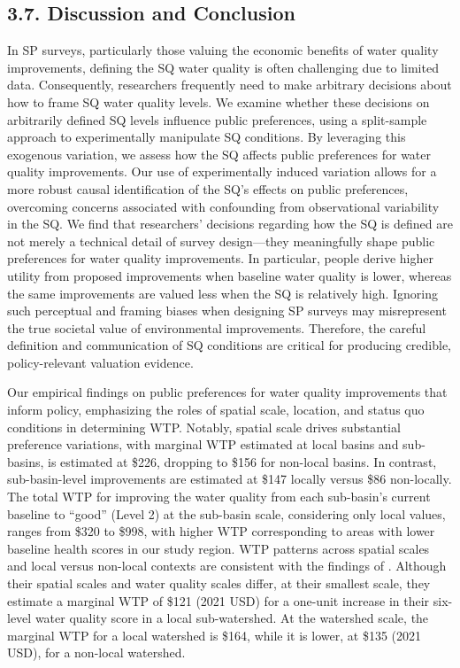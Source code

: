 \documentclass[12pt]{article}
\begin{document}
\restoregeometry %

\subsection*{3.7. Discussion and Conclusion}





In SP surveys, particularly those valuing the economic benefits of water quality improvements, defining the SQ water quality is often 
challenging due to limited data. Consequently, researchers frequently need to make arbitrary decisions about how to frame SQ water 
quality levels. We examine whether these decisions on arbitrarily defined SQ levels influence public preferences, using a split-sample 
approach to experimentally manipulate SQ conditions. By leveraging this exogenous variation, we assess how the SQ affects public 
preferences for water quality improvements. Our use of experimentally induced variation allows for a more robust causal identification 
of the SQ's effects on public preferences, overcoming concerns associated with confounding from observational variability in the SQ. We 
find that researchers’ decisions regarding how the SQ is defined are not merely a technical detail of survey design—they meaningfully 
shape public preferences for water quality improvements. In particular, people derive higher utility from proposed improvements 
when baseline water quality is lower, whereas the same improvements are valued less when the SQ is relatively high. Ignoring 
such perceptual and framing biases when designing SP surveys may misrepresent the true societal value of environmental improvements. 
Therefore, the careful definition and communication of SQ conditions are critical for producing credible, policy-relevant valuation evidence.

Our empirical findings on public preferences for water quality improvements that inform policy, emphasizing the roles of 
spatial scale, location, and status quo conditions in determining WTP. Notably, spatial scale drives substantial preference 
variations, with marginal WTP estimated at local basins and sub-basins, is estimated at \$226, dropping to \$156 for 
non-local basins. In contrast, sub-basin-level improvements are estimated at \$147 locally versus \$86 non-locally. The total WTP for 
improving the water quality from each sub-basin’s current baseline to “good” (Level 2) at the sub-basin scale, considering 
only local values, ranges from \$320 to \$998, with higher WTP corresponding to areas with lower baseline health scores in our study region.
WTP patterns across spatial scales and local versus non-local contexts are consistent with the findings of \textcite{vossler2023valuing}. 
Although their spatial scales and water quality scales differ, at their smallest scale, they estimate a marginal WTP of \$121 
(2021 USD) for a one-unit increase in their six-level water quality score in a local sub-watershed. At the watershed scale, 
the marginal WTP for a local watershed is \$164, while it is lower, at \$135 (2021 USD), for a non-local watershed.
\end{document}
